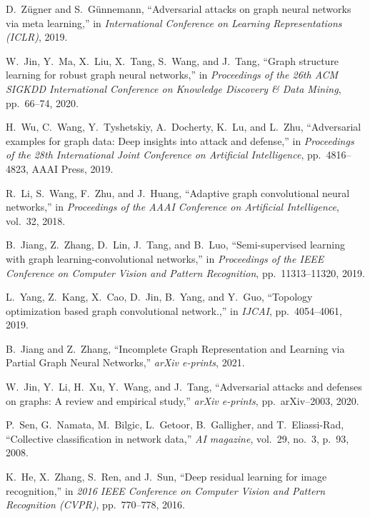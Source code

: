 \documentclass{article}
\begin{document}
\begin{thebibliography}{10}
D.~Z{\"u}gner and S.~G{\"u}nnemann, ``Adversarial attacks on graph neural
  networks via meta learning,'' in {\em International Conference on Learning
  Representations (ICLR)}, 2019.
  
W.~Jin, Y.~Ma, X.~Liu, X.~Tang, S.~Wang, and J.~Tang, ``Graph structure
  learning for robust graph neural networks,'' in {\em Proceedings of the 26th
  ACM SIGKDD International Conference on Knowledge Discovery \& Data Mining},
  pp.~66--74, 2020.
  
H.~Wu, C.~Wang, Y.~Tyshetskiy, A.~Docherty, K.~Lu, and L.~Zhu, ``Adversarial
  examples for graph data: Deep insights into attack and defense,'' in {\em
  Proceedings of the 28th International Joint Conference on Artificial
  Intelligence}, pp.~4816--4823, AAAI Press, 2019.
  
R.~Li, S.~Wang, F.~Zhu, and J.~Huang, ``Adaptive graph convolutional neural
  networks,'' in {\em Proceedings of the AAAI Conference on Artificial
  Intelligence}, vol.~32, 2018.
  
B.~Jiang, Z.~Zhang, D.~Lin, J.~Tang, and B.~Luo, ``Semi-supervised learning
  with graph learning-convolutional networks,'' in {\em Proceedings of the IEEE
  Conference on Computer Vision and Pattern Recognition}, pp.~11313--11320,
  2019.

L.~Yang, Z.~Kang, X.~Cao, D.~Jin, B.~Yang, and Y.~Guo, ``Topology optimization
  based graph convolutional network.,'' in {\em IJCAI}, pp.~4054--4061, 2019.
  
B.~{Jiang} and Z.~{Zhang}, ``{Incomplete Graph Representation and Learning via
  Partial Graph Neural Networks},'' {\em arXiv e-prints}, 2021.
  
W.~Jin, Y.~Li, H.~Xu, Y.~Wang, and J.~Tang, ``Adversarial attacks and defenses
  on graphs: A review and empirical study,'' {\em arXiv e-prints},
  pp.~arXiv--2003, 2020.
  
P.~Sen, G.~Namata, M.~Bilgic, L.~Getoor, B.~Galligher, and T.~Eliassi-Rad,
  ``Collective classification in network data,'' {\em AI magazine}, vol.~29,
  no.~3, p.~93, 2008.
  
K.~He, X.~Zhang, S.~Ren, and J.~Sun, ``Deep residual learning for image
  recognition,'' in {\em 2016 IEEE Conference on Computer Vision and Pattern
  Recognition (CVPR)}, pp.~770--778, 2016.
  

\end{thebibliography}
\end{document}
